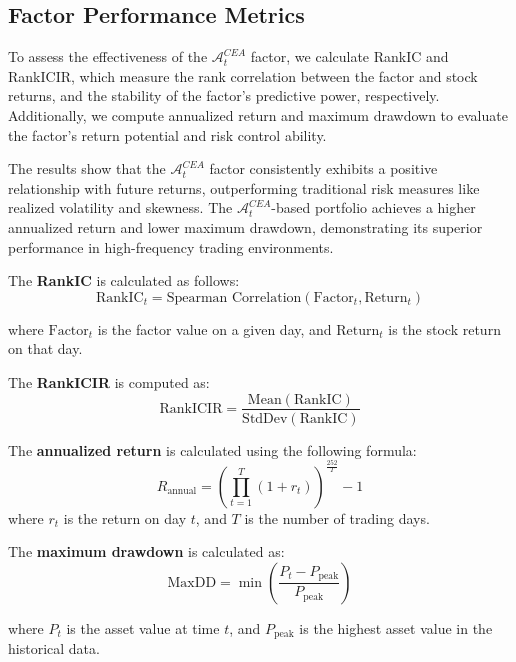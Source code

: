 \documentclass[preprint,12pt,authoryear]{elsarticle}
\begin{document}
\subsection{Factor Performance Metrics}
To assess the effectiveness of the \(\mathcal{A}^{CEA}_t\) factor, we calculate RankIC and RankICIR, which measure the rank correlation between the factor and stock returns, and the stability of the factor's predictive power, respectively. Additionally, we compute annualized return and maximum drawdown to evaluate the factor's return potential and risk control ability.

The results show that the \(\mathcal{A}^{CEA}_t\) factor consistently exhibits a positive relationship with future returns, outperforming traditional risk measures like realized volatility and skewness. The \(\mathcal{A}^{CEA}_t\)-based portfolio achieves a higher annualized return and lower maximum drawdown, demonstrating its superior performance in high-frequency trading environments.

The \textbf{RankIC} is calculated as follows:
\begin{equation}
    \text{RankIC}_t = \text{Spearman Correlation}(\text{Factor}_t, \text{Return}_t)
\end{equation}

where \(\text{Factor}_t\) is the factor value on a given day, and \(\text{Return}_t\) is the stock return on that day.

The \textbf{RankICIR} is computed as:
\begin{equation}
    \text{RankICIR} = \frac{\text{Mean}(\text{RankIC})}{\text{StdDev}(\text{RankIC})}
\end{equation}

The \textbf{annualized return} is calculated using the following formula:
\begin{equation}
    R_{\text{annual}} = \left( \prod_{t=1}^{T} (1 + r_t) \right)^{\frac{252}{T}} - 1
\end{equation}
where \(r_t\) is the return on day \(t\), and \(T\) is the number of trading days.

The \textbf{maximum drawdown} is calculated as:
\begin{equation}
    \text{MaxDD} = \min \left( \frac{P_t - P_{\text{peak}}}{P_{\text{peak}}} \right)
\end{equation}

where \(P_t\) is the asset value at time \(t\), and \(P_{\text{peak}}\) is the highest asset value in the historical data.
\end{document}

